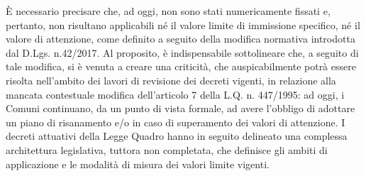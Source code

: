 È necessario precisare che, ad oggi, non sono stati numericamente fissati e, pertanto, non risultano applicabili né il valore limite di immissione specifico, né il valore di attenzione, come definito a seguito della modifica normativa introdotta dal D.Lgs. n.42/2017.
Al proposito, è indispensabile sottolineare che, a seguito di tale modifica, si è venuta a creare una criticità, che auspicabilmente potrà essere risolta nell'ambito dei lavori di revisione dei decreti vigenti, in relazione alla mancata contestuale modifica dell’articolo 7 della L.Q. n.
447/1995: ad oggi, i Comuni continuano, da un punto di vista formale, ad avere l'obbligo di adottare un piano di risanamento  e/o in caso di superamento dei valori di attenzione.
I decreti attuativi della Legge Quadro hanno in seguito delineato una complessa architettura legislativa, tuttora non completata, che definisce gli ambiti di applicazione e le modalità di misura dei valori limite vigenti.


